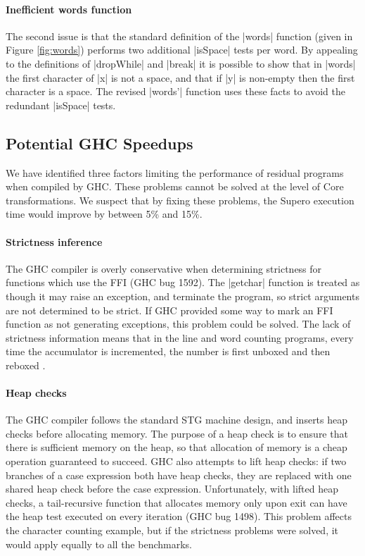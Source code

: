 \documentclass{llncs}
\begin{document}
\paragraph{Inefficient \textsf{words} function}

The second issue is that the standard definition of the |words| function (given in Figure \ref{fig:words}) performs two additional |isSpace| tests per word. By appealing to the definitions of |dropWhile| and |break| it is possible to show that in |words| the first character of |x| is not a space, and that if |y| is non-empty then the first character is a space. The revised |words'| function uses these facts to avoid the redundant |isSpace| tests.

\subsection{Potential GHC Speedups}

We have identified three factors limiting the performance of residual programs when compiled by GHC. These problems cannot be solved at the level of Core transformations. We suspect that by fixing these problems, the Supero execution time would improve by between 5\% and 15\%.

\paragraph{Strictness inference}

The GHC compiler is overly conservative when determining strictness for functions which use the FFI (GHC bug 1592). The |getchar| function is treated as though it may raise an exception, and terminate the program, so strict arguments are not determined to be strict. If GHC provided some way to mark an FFI function as not generating exceptions, this problem could be solved. The lack of strictness information means that in the line and word counting programs, every time the accumulator is incremented, the number is first unboxed and then reboxed \cite{spj:unboxing}.

\paragraph{Heap checks}

The GHC compiler follows the standard STG machine \cite{spj:implementation} design, and inserts heap checks before allocating memory. The purpose of a heap check is to ensure that there is sufficient memory on the heap, so that allocation of memory is a cheap operation guaranteed to succeed. GHC also attempts to lift heap checks: if two branches of a case expression both have heap checks, they are replaced with one shared heap check before the case expression. Unfortunately, with lifted heap checks, a tail-recursive function that allocates memory only upon exit can have the heap test executed on every iteration (GHC bug 1498). This problem affects the character counting example, but if the strictness problems were solved, it would apply equally to all the benchmarks.
\end{document}
